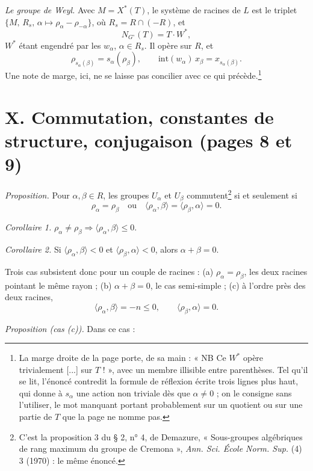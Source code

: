 \documentclass[11pt,a4paper]{article}
\begin{document}
\emph{Le groupe de Weyl.} Avec $M = X^*(T)$, le système de racines de $L$ est
le triplet $\{M,\, R_s,\, \alpha \mapsto \rho_\alpha - \rho_{-\alpha}\}$, où
$R_s = R \cap (-R)$, et
\[
  N_{G^\circ}(T) = T \cdot W^{*},
\]
$W^*$ étant engendré par les $w_\alpha$, $\alpha \in R_s$. Il opère sur $R$, et
\[
  \rho_{s_\alpha(\beta)} = s_\alpha(\rho_\beta), \qquad
  \mathrm{int}(w_\alpha)\,x_\beta = x_{s_\alpha(\beta)} .
\]
Une note de marge, ici, ne se laisse pas concilier avec ce qui
précède.\footnote{La marge droite de la page porte, de sa main : « NB Ce $W^*$ opère
trivialement [...] sur $T$ ! », avec un membre illisible entre parenthèses. Tel
qu'il se lit, l'énoncé contredit la formule de réflexion écrite trois lignes
plus haut, qui donne à $s_\alpha$ une action non triviale dès que $\alpha \neq
0$ ; on le consigne sans l'utiliser, le mot manquant portant probablement sur
un quotient ou sur une partie de $T$ que la page ne nomme pas.}

\section*{X. Commutation, constantes de structure, conjugaison (pages 8 et 9)}

\emph{Proposition.} Pour $\alpha, \beta \in R$, les groupes $U_\alpha$ et
$U_\beta$ commutent\footnote{C'est la proposition 3 du § 2, n° 4, de
Demazure, « Sous-groupes algébriques de rang maximum du groupe de Cremona »,
\emph{Ann. Sci. École Norm. Sup.} (4) 3 (1970) : le même énoncé.} si et seulement si
\[
  \rho_\alpha = \rho_\beta \quad \text{ou} \quad
  \langle \rho_\alpha, \beta \rangle = \langle \rho_\beta, \alpha \rangle = 0.
\]

\emph{Corollaire 1.} $\rho_\alpha \neq \rho_\beta \Longrightarrow \langle
\rho_\alpha, \beta \rangle \leq 0$.

\emph{Corollaire 2.} Si $\langle \rho_\alpha, \beta \rangle < 0$ et $\langle
\rho_\beta, \alpha \rangle < 0$, alors $\alpha + \beta = 0$.

Trois cas subsistent donc pour un couple de racines : (a) $\rho_\alpha =
\rho_\beta$, les deux racines pointant le même rayon ; (b) $\alpha + \beta =
0$, le cas semi-simple ; (c) à l'ordre près des deux racines,
\[
  \langle \rho_\alpha, \beta \rangle = -n \leq 0, \qquad
  \langle \rho_\beta, \alpha \rangle = 0 .
\]

\emph{Proposition (cas (c)).} Dans ce cas :
\end{document}

